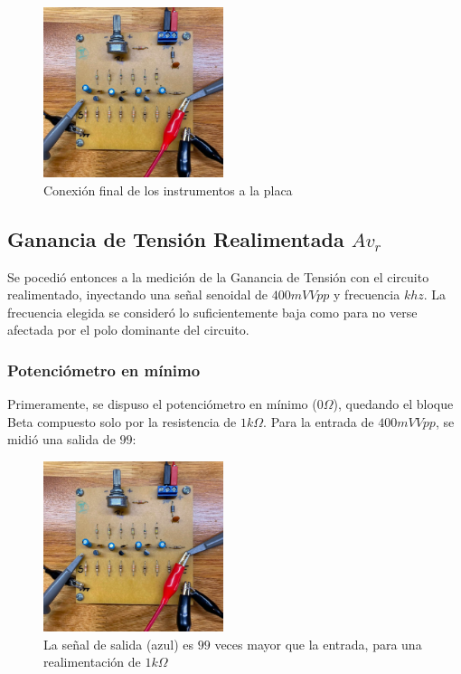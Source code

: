 \documentclass[letterpaper, 10 pt, conference]{ieeeconf}  %
\begin{document}
\begin{figure}[H]
  \centering
  \includegraphics[width=0.47\textwidth]{imagenes/placa conectada.jpg}
  \caption{Conexión final de los instrumentos a la placa}
  \label{fig:placaconectada}
\end{figure}

\subsection{Ganancia de Tensión Realimentada $Av_r$}

Se pocedió entonces a la medición de la Ganancia de Tensión con el circuito realimentado, inyectando una señal senoidal de $400mV Vpp$ y frecuencia $khz$.
La frecuencia elegida se consideró lo suficientemente baja como para no verse afectada por el polo dominante del circuito.\\

\subsubsection{Potenciómetro en mínimo}

Primeramente, se dispuso el potenciómetro en mínimo ($0\Omega$), quedando el bloque Beta compuesto solo por la resistencia de $1k\Omega$.
Para la entrada de $400mV Vpp$, se midió una salida de $99$:

\begin{figure}[H]
  \centering
  \includegraphics[width=0.47\textwidth]{imagenes/placa conectada.jpg}
  \caption{La señal de salida (azul) es $99$ veces mayor que la entrada, para una realimentación de $1k\Omega$}
  \label{fig:osciloscopio_ganancia_pote_max}
\end{figure}
\end{document}

